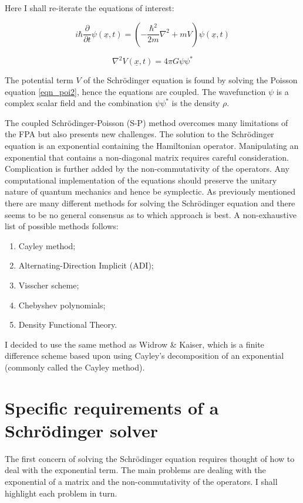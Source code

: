 Here I shall re-iterate the equations of interest:

\begin{equation}
\label{eqn_schroedinger2}
 i\hbar\frac{\partial}{\partial t}\psi(\underline{x},t) = \left( -\frac{\hbar^2}{2m} \nabla^2 + mV \right) \psi(\underline{x},t)
\end{equation}

\begin{equation}
\label{eqn_poi2}
\nabla^2 V(\underline{x},t) = 4\pi G \psi\psi^*
\end{equation}

\noindent The potential term $V$ of the Schr\"odinger equation is found by solving the Poisson equation \ref{eqn_poi2}, hence the equations are coupled. The wavefunction $\psi$ is a complex scalar field and the combination $\psi\psi^*$ is the density $\rho$.

The coupled Schr\"odinger-Poisson (S-P) method overcomes many limitations of the FPA but also presents new challenges. The solution to the Schr\"odinger equation is an exponential containing the Hamiltonian operator. Manipulating an exponential that contains a non-diagonal matrix requires careful consideration. Complication is further added by the non-commutativity of the operators. Any computational implementation of the equations should preserve the unitary nature of quantum mechanics and hence be symplectic. As previously mentioned there are many different methods for solving the Schr\"odinger equation and there seems to be no general consensus as to which approach is best. A non-exhaustive list of possible methods follows:

\begin{enumerate}
\item Cayley method;
\item Alternating-Direction Implicit (ADI);
\item Visscher scheme;
\item Chebyshev polynomials;
\item Density Functional Theory.
\end{enumerate}

\noindent I decided to use the same method as Widrow \& Kaiser, which is a finite difference scheme based upon using Cayley's decomposition of an exponential (commonly called the Cayley method).

\section{Specific requirements of a Schr\"odinger solver}
\label{spec_requirements}
The first concern of solving the Schr\"odinger equation requires thought of how to deal with the exponential term. The main problems are dealing with the exponential of a matrix and the non-commutativity of the operators. I shall highlight each problem in turn.

